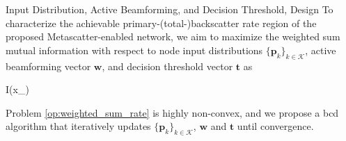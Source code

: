 \documentclass[journal]{IEEEtran}
\begin{document}
\begin{section}{Input Distribution, Active Beamforming, and Decision Threshold, Design}
	To characterize the achievable primary-(total-)backscatter rate region of the proposed Metascatter-enabled network, we aim to maximize the weighted sum mutual information with respect to node input distributions $\{\boldsymbol{p}_k\}_{k \in \mathcal{K}}$, active beamforming vector $\boldsymbol{w}$, and decision threshold vector $\boldsymbol{t}$ as
	\begin{maxi!}
		{}{I(x_{})}{\label{op:weighted_sum_rate}}{\label{ob:weighted_sum_rate}}
	\end{maxi!}
	Problem \eqref{op:weighted_sum_rate} is highly non-convex, and we propose a \gls{bcd} algorithm that iteratively updates $\{\boldsymbol{p}_k\}_{k \in \mathcal{K}}$, $\boldsymbol{w}$ and $\boldsymbol{t}$ until convergence.


\end{section}
\end{document}
